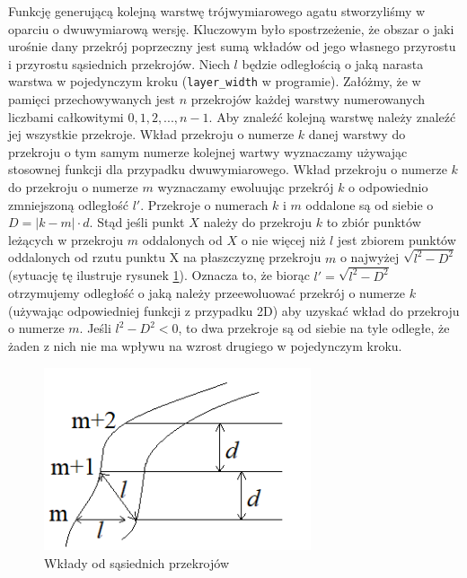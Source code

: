 \documentclass{article}
\begin{document}
Funkcję generującą kolejną warstwę trójwymiarowego agatu stworzyliśmy w oparciu o dwuwymiarową wersję. Kluczowym było spostrzeżenie, że obszar o jaki urośnie dany przekrój poprzeczny jest sumą wkładów od jego własnego przyrostu i przyrostu sąsiednich przekrojów. Niech $l$ będzie odległością o jaką narasta warstwa w pojedynczym kroku (\texttt{layer\_width} w programie). Załóżmy, że w pamięci przechowywanych jest $n$ przekrojów każdej warstwy numerowanych liczbami całkowitymi $0,1,2,...,n-1$. Aby znaleźć kolejną warstwę należy znaleźć jej wszystkie przekroje. Wkład przekroju o numerze $k$ danej warstwy do przekroju o tym samym numerze kolejnej wartwy wyznaczamy używając stosownej funkcji dla przypadku dwuwymiarowego. Wkład przekroju o numerze $k$ do przekroju o numerze $m$ wyznaczamy ewoluując przekrój $k$ o odpowiednio zmniejszoną odległość $l'$. Przekroje o numerach $k$ i $m$ oddalone są od siebie o $D=|k-m| \cdot d$. Stąd jeśli punkt $X$ należy do przekroju $k$ to zbiór punktów leżących w przekroju $m$ oddalonych od $X$ o nie więcej niż $l$ jest zbiorem punktów oddalonych od rzutu punktu X na płaszczyznę przekroju $m$ o najwyżej $\sqrt{l^2-D^2}$ (sytuację tę ilustruje rysunek \ref{wklady_od_przekrojow}). Oznacza to, że biorąc $l'=\sqrt{l^2-D^2}$ otrzymujemy odległość o jaką należy przeewoluować przekrój o numerze $k$ (używając odpowiedniej funkcji z przypadku 2D) aby uzyskać wkład do przekroju o numerze $m$. Jeśli $l^2-D^2<0$, to dwa przekroje są od siebie na tyle odległe, że żaden z nich nie ma wpływu na wzrost drugiego w pojedynczym kroku.
\begin{figure}[H]
\caption{Wkłady od sąsiednich przekrojów}
\label{wklady_od_przekrojow}
\centering
\includegraphics[width=0.7\textwidth]{obrazy/wklady_od_przekrojow.png}
\end{figure}
\end{document}
